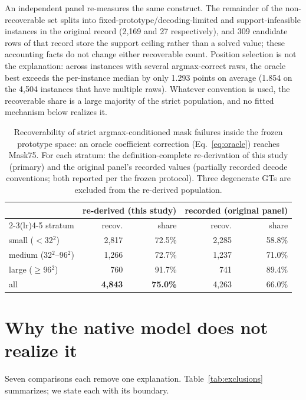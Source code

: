 ﻿\documentclass[times,twocolumn,final,authoryear]{elsarticle}
\begin{document}
An independent panel re-measures the same construct. The remainder of the non-recoverable set
splits into fixed-prototype/decoding-limited and support-infeasible instances in the original record
(2{,}169 and 27 respectively), and 309 candidate rows of that record store the support ceiling
rather than a solved value; these accounting facts do not change either recoverable count. Position
selection is not the explanation: across instances with several argmax-correct raws, the oracle
best exceeds the per-instance median by only 1.293 points on average (1.854 on the 4{,}504
instances that have multiple raws). Whatever convention is used, the recoverable share is a large
majority of the strict population, and no fitted mechanism below realizes it.

\begin{table}[b]
\caption{Recoverability of strict argmax-conditioned mask failures inside the frozen prototype
space: an oracle coefficient correction (Eq.~\ref{eq:oracle}) reaches Mask75. For each stratum:
the definition-complete re-derivation of this study (primary) and the original panel's recorded
values (partially recorded decode conventions; both reported per the frozen protocol). Three
degenerate GTs are excluded from the re-derived population.}
\label{tab:recoverability}
\centering
\begin{tabular}{@{}lrrrr@{}}
\toprule
& \multicolumn{2}{c}{re-derived (this study)} & \multicolumn{2}{c}{recorded (original panel)} \\
\cmidrule(lr){2-3}\cmidrule(lr){4-5}
stratum & recov. & share & recov. & share \\
\midrule
small ($<$32$^2$)     & 2{,}817 & 72.5\% & 2{,}285 & 58.8\% \\
medium (32$^2$--96$^2$) & 1{,}266 & 72.7\% & 1{,}237 & 71.0\% \\
large ($\ge$96$^2$)   & 760 & 91.7\% & 741 & 89.4\% \\
\midrule
all                   & \textbf{4{,}843} & \textbf{75.0\%} & 4{,}263 & 66.0\% \\
\bottomrule
\end{tabular}
\end{table}

\section{Why the native model does not realize it}
\label{sec:exclusions}
Seven comparisons each remove one explanation. Table~\ref{tab:exclusions} summarizes; we state each
with its boundary.
\end{document}
